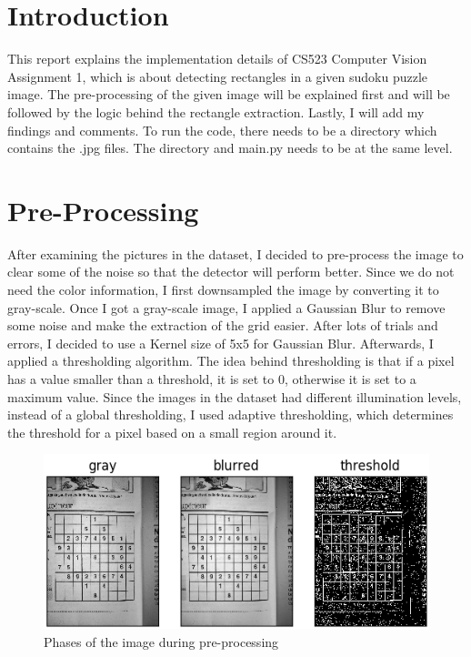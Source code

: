 \section*{Introduction}

This report explains the implementation details of CS523 Computer Vision Assignment 1, which is about detecting rectangles in a given sudoku puzzle image. The pre-processing of the given image will be explained first and will be followed by the logic behind the rectangle extraction. Lastly, I will add my findings and comments. To run the code, there needs to be a directory which contains the .jpg files. The directory and main.py needs to be at the same level. 


\section*{Pre-Processing}

After examining the pictures in the dataset, I decided to pre-process the image to clear some of the noise so that the detector will perform better. Since we do not need the color information, I first downsampled the image by converting it to gray-scale. Once I got a gray-scale image, I applied a Gaussian Blur to remove some noise and make the extraction of the grid easier. After lots of trials and errors, I decided to use a Kernel size of 5x5 for Gaussian Blur. Afterwards, I applied a
thresholding algorithm. The idea behind thresholding is that if a pixel has a value smaller than a threshold, it is set to 0, otherwise it is set to a maximum value. Since the images in the dataset had different illumination levels, instead of a global thresholding, I used adaptive thresholding, which determines the threshold for a pixel based on a small region around it.

\begin{figure}[H]
    \centering
    \includegraphics[width=\textwidth]{images/preprocess.png}
    \caption{Phases of the image during pre-processing}
    \setlength{\belowcaptionskip}{-20pt}
    \setlength{\abovecaptionskip}{-20pt}
\end{figure}

